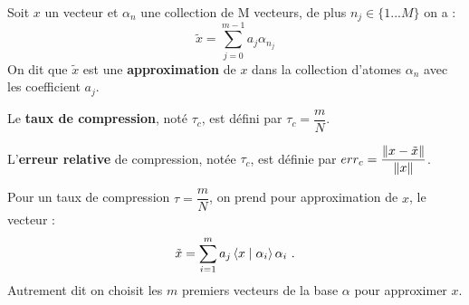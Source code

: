 \begin{defn}[Approximation]
	Soit $x$ un vecteur et $\alpha_{n}$ une collection de M vecteurs, de plus $n_{j}\in \lbrace 1 ... M \rbrace$ on a :
	$$\tilde{x} = \sum_{j=0}^{m-1} a_{j} \alpha_{n_{j}}$$
	On dit que $\tilde{x}$ est une \textbf{approximation} de $x$ dans la collection d'atomes $\alpha_{n}$ avec les coefficient $a_{j}$.
\end{defn}

\begin{defn}
	Le \textbf{taux de compression}, noté $\tau_{c}$, est défini par $\tau_{c} = \dfrac{m}{N}$.
\end{defn}

\begin{defn}
	L'\textbf{erreur relative} de compression, notée $\tau_{c}$, est définie par
	$err_{c} = \dfrac{ \left\lVert x-\tilde{x}\right\rVert }{\left\lVert x\right\rVert}$.
\end{defn}

\begin{defn}
	Pour un taux de compression $\tau = \dfrac{m}{N}$, on prend pour approximation de $x$, le vecteur :
	$$\tilde{x} = \sum_{i=1}^{m} a_{j} \left\langle x \mid \alpha_{i} \right\rangle \alpha_{i}\ .$$
	Autrement dit on choisit les $m$ premiers vecteurs de la base $\alpha$ pour approximer $x$.
\end{defn}